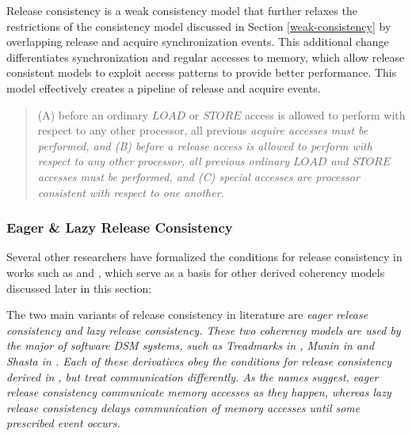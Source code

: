 Release consistency is a weak consistency model that further relaxes the restrictions of the consistency model discussed in Section \ref{weak-consistency} by overlapping release and acquire synchronization events.  This additional change differentiates synchronization and regular accesses to memory, which allow release consistent models to exploit access patterns to provide better performance.  This model effectively creates a pipeline of release and acquire events.

\begin{quote}
\begin{condition}
(A) before an ordinary $LOAD$ or $STORE$ access is allowed to perform with respect to any other processor, all previous \em acquire \em accesses must be performed, and (B) before a \em release \em access is allowed to perform with respect to any other processor, all previous ordinary $LOAD$ and $STORE$ accesses must be performed, and (C) \em special accesses \em are processor consistent with respect to one another.
\end{condition}
\end{quote}

\subsubsection{Eager \& Lazy Release Consistency}

Several other researchers have formalized the conditions for release consistency in works such as \cite{Gharachorloo:1990:MCE:325164.325102} and \cite{Keleher:1992:LRC:139669.139676}, which serve as a basis for other derived coherency models discussed later in this section:

The two main variants of release consistency in literature are \em eager release consistency \em and \em lazy release consistency\em.  These two coherency models are used by the major of software DSM systems, such as Treadmarks in \cite{Amza:1996:TSM:226705.226708,Keleher:1994:TDS:1267074.1267084}, Munin in \cite{Keleher:1992:LRC:139669.139676, Bennett:1990:MDS:99163.99182, Carter:1991:IPM:121132.121159, Zwaenepoel:1992:MDS:134397.135235} and Shasta in \cite{Scales:1996:SLO:237090.237179}.  Each of these derivatives obey the conditions for release consistency derived in \cite{Gharachorloo:1990:MCE:325164.325102}, but treat communication differently.  As the names suggest, \em eager release consistency \em communicate memory accesses as they happen, whereas \em lazy release consistency \em delays communication of memory accesses until some prescribed event occurs.

